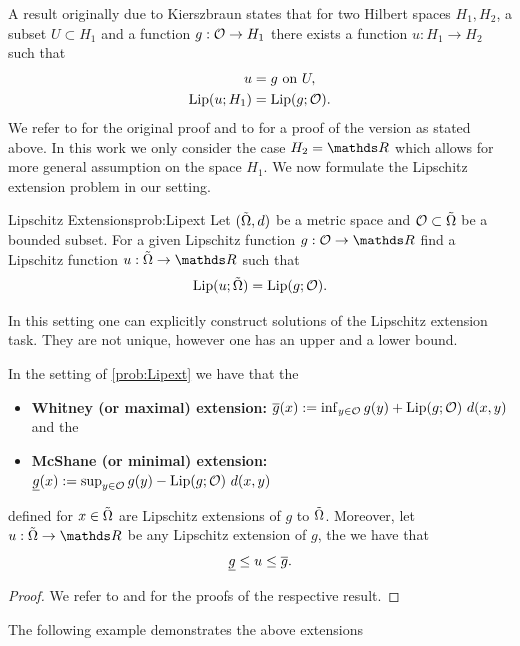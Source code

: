 %
A result originally due to 
Kierszbraun \cite{Kirszbraun1934} states that for two Hilbert spaces $H_1, H_2$, a subset $U\subset H_1$ and a function $g:\mathcal{O}\to H_1$ there exists a function $u:H_1\to H_2$ such that 
%
\begin{align*}
u &= g \text{ on } U,\\
\operatorname{Lip}(u; H_1) &= \operatorname{Lip}(g; \mathcal{O}).
\end{align*}
%
We refer to \cite{Kirszbraun1934} for the original proof and to \cite[Th. 1.31]{Schwartz1969} for a proof of the version as stated above.
In this work we only consider the case $H_2=\R$ which allows for more general assumption on the space $H_1$. We now formulate the Lipschitz extension problem in our setting.
%
\begin{problem}{Lipschitz Extensions}{prob:Lipext}
Let $(\tilde{\Omega},d)$ be a metric space and $\mathcal{O}\subset \tilde{\Omega}$ be a bounded subset. For a given Lipschitz function $g:\conset\to\R$ find a Lipschitz function $u:\tilde\domain\to \R$ such that
%
\begin{align*}
\operatorname{Lip}(u; \tilde{\Omega}) = \operatorname{Lip}(g; \mathcal{O}).
\end{align*}
\end{problem}
%
In this setting one can explicitly construct solutions of the Lipschitz extension task. They are not unique, however one has an upper and a lower bound.
%
\begin{lemma}{}{}
In the setting of \cref{prob:Lipext} we have that the 
%
\begin{itemize}
\item \textbf{Whitney (or maximal) extension:} $\overline{g}(x) := \inf_{y\in \mathcal{O}} g(y) + \operatorname{Lip}(g; \mathcal{O})\ d(x,y)$ and the
\item \textbf{McShane (or minimal) extension:} $\underline{g}(x) := \sup_{y\in \mathcal{O}} g(y) - \operatorname{Lip}(g; \mathcal{O})\ d(x,y)$
\end{itemize}
%
defined for $x\in\tilde{\Omega}$ are Lipschitz extensions of $g$ to $\tilde{\Omega}$. Moreover, let $u:\tilde\domain\to\R$ be any Lipschitz extension of 
$g$, the we have that
%
\begin{align*}
\underline{g} \leq u \leq \overline{g}.
\end{align*} 
\end{lemma}
%
\begin{proof}
We refer to \cite{whitney1992analytic} and \cite{mcshane1934extension} for the proofs of the respective result.
\end{proof}
%
The following example demonstrates the above extensions
%
